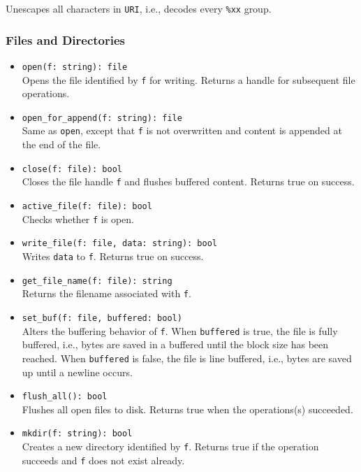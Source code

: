 \documentclass[10pt,landscape]{article}
\begin{document}
\begin{multicols*}{2}
\begin{itemize}
    Unescapes all characters in \texttt{URI}, i.e., decodes every \verb|%xx|
    group.
\end{itemize}

\subsubsection*{Files and Directories}

\begin{itemize}
  \item \verb|open(f: string): file|\\
    Opens the file identified by \texttt{f} for writing. Returns a handle
    for subsequent file operations.
  \item \verb|open_for_append(f: string): file|\\
    Same as \texttt{open}, except that \texttt{f} is not overwritten and
    content is appended at the end of the file.
  \item \verb|close(f: file): bool|\\
    Closes the file handle \texttt{f} and flushes buffered content. Returns
    true on success.
  \item \verb|active_file(f: file): bool|\\
    Checks whether \texttt{f} is open.
  \item \verb|write_file(f: file, data: string): bool|\\
    Writes \texttt{data} to \texttt{f}. Returns true on success.
  \item \verb|get_file_name(f: file): string|\\
    Returns the filename associated with \texttt{f}.
  \item \verb|set_buf(f: file, buffered: bool)|\\
    Alters the buffering behavior of \texttt{f}. When \texttt{buffered} is
    true, the file is fully buffered, i.e., bytes are saved in a buffered until
    the block size has been reached. When \texttt{buffered} is false, the file
    is line buffered, i.e., bytes are saved up until a newline occurs.
  \item \verb|flush_all(): bool|\\
    Flushes all open files to disk.
    Returns true when the operations(s) succeeded.
  \item \verb|mkdir(f: string): bool|\\
    Creates a new directory identified by \texttt{f}. Returns true if the
    operation succeeds and \texttt{f} does not exist already.
\end{itemize}

\end{multicols*}
\end{document}
